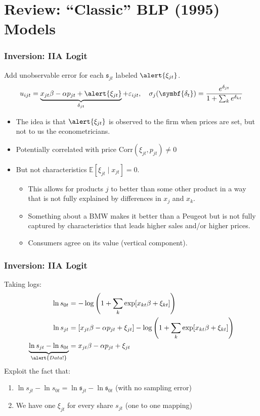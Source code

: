 \documentclass[aspectratio=169,10pt]{beamer}
\begin{document}
\section*{Review: ``Classic'' BLP (1995) Models}
\begin{frame}
\frametitle{Inversion: IIA Logit}
Add unobservable error for each $\mathfrak{s}_{jt}$ labeled $\alert{\xi_{jt}}$.
\begin{align*}
u_{ijt} = \underbrace{x_{jt} \beta -\alpha p_{jt} + \alert{\xi_{jt}}}_{\delta_{jt}} +  \varepsilon_{ijt} , \quad 
\sigma_j(\symbf{\delta_{t}}) = \frac{e^{\delta_{jt}} }{1+\sum_k e^{\delta_{kt}} } 
\end{align*}
\vspace{-0.5cm}
\begin{itemize}
\item The idea is that $\alert{\xi_{jt}}$ is observed to the firm when prices are set, but not to us the econometricians.
\item Potentially correlated with price $\text{Corr}(\xi_{jt},p_{jt}) \neq 0$
\item But not characteristics $\mathbb{E}[\xi_{jt} \mid  x_{jt}]=0$.
\begin{itemize}
\item This allows for products $j$ to better than some other product in a way that is not fully explained by differences in $x_j$ and $x_k$.
\item Something about a BMW makes it better than a Peugeot but is not fully captured by characteristics that leads higher sales and/or higher prices.
\item Consumers agree on its value  (\alert{vertical component}).
\end{itemize}
\end{itemize}
\end{frame}



\begin{frame}
\frametitle{Inversion: IIA Logit}
Taking logs:
\begin{align*}
\ln s_{0t} &= -\log \left(1+\sum_k \exp[x_{kt} \beta + \xi_{kt}] \right) \\
\ln s_{jt} &= [x_{jt} \beta - \alpha p_{jt} +  \xi_{jt} ] - \log \left(1+\sum_k \exp[x_{kt} \beta + \xi_{kt}] \right)\\
\underbrace{\ln s_{jt}- \ln s_{0t}}_{\alert{Data!}} &= x_{jt} \beta -\alpha p_{jt} +  \xi_{jt}
\end{align*}
Exploit the fact that: 
\begin{enumerate}
\item $\ln s_{jt}- \ln s_{0t}= \ln \mathfrak{s}_{jt}- \ln \mathfrak{s}_{0t}$  (with no sampling error)
\item We have one $\xi_{jt}$ for every share $s_{jt}$ (one to one mapping)
\end{enumerate}
\end{frame}
\end{document}
